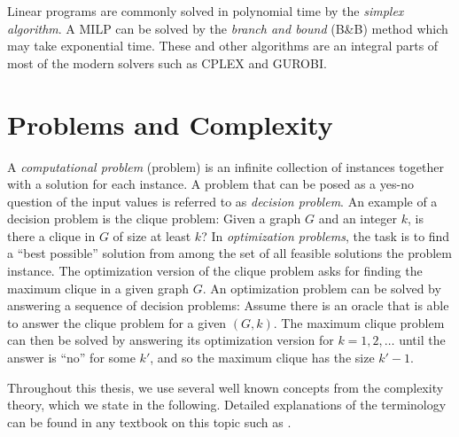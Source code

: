 Linear programs are commonly solved in polynomial time by the \emph{simplex algorithm}.
A MILP can be solved by the \emph{branch and bound} (B\&B) method which may take exponential time.
These and other algorithms are an integral parts of most of the modern solvers such as CPLEX and GUROBI.

\section{Problems and Complexity}\label{sect:probcomp}

A \emph{computational problem} (problem) is an infinite collection of instances together with a solution for each instance.
A problem that can be posed as a yes-no question of the input values is referred to as \emph{decision problem}.
An example of a decision problem is the clique problem: Given a graph $G$ and an integer $k$, is there a clique in $G$ of size at least $k$?
In \emph{optimization problems}, the task is to find a ``best possible'' solution from among the set of all feasible solutions the problem instance.
The optimization version of the clique problem asks for finding the maximum clique in a given graph $G$.
An optimization problem can be solved by answering a sequence of decision problems:
Assume there is an oracle that is able to answer the clique problem for a given $(G,k)$.
The maximum clique problem can then be solved by answering its optimization version for $k=1,2,\dots$ until the answer is ``no'' for some $k'$, and so the maximum clique has the size $k'-1$.

Throughout this thesis, we use several well known concepts from the complexity theory, which we state in the following.
Detailed explanations of the terminology can be found in any textbook on this topic such as \cite{sipser06}.

